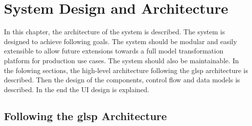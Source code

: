   \section{System Design and Architecture}
  \label{sec:system-design}

  In this chapter, the architecture of the system is described. The system is designed to achieve following goals. The system should be modular and easily extensible to allow future extensions towards a full model transformation platform for production use cases. The system should also be maintainable. In the folowing sections, the high-level architecture following the \ac{glsp} architecture is described. Then the design of the components, control flow and data models is described. In the end the UI design is explained.

  \subsection{Following the \ac{glsp} Architecture}
  \label{subsec:high-level-architecture}

